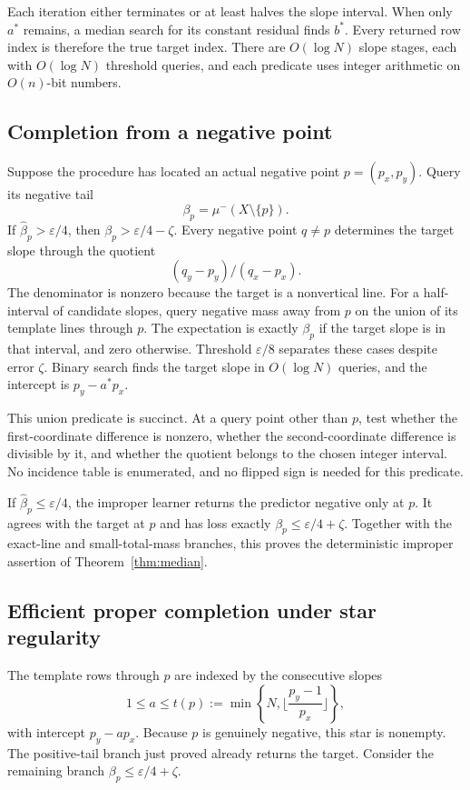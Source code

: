 \documentclass[11pt,letterpaper,pmlr,twoside]{jmlr}
\newcommand{\eps}{\varepsilon}
\newcommand{\floor}[1]{\lfloor #1\rfloor}
\begin{document}
Each iteration either terminates or at least halves the slope interval. When only $a^*$ remains, a median search for its constant residual finds $b^*$. Every returned row index is therefore the true target index. There are $O(\log N)$ slope stages, each with $O(\log N)$ threshold queries, and each predicate uses integer arithmetic on $O(n)$-bit numbers.



\subsection{Completion from a negative point}
Suppose the procedure has located an actual negative point $p=(p_x,p_y)$. Query its negative tail
\[
 \beta_p=\mu^-(X\setminus\{p\}).
\]
If $\hat\beta_p>\eps/4$, then $\beta_p>\eps/4-\zeta$. Every negative point $q\ne p$ determines the target slope through the quotient
\[
 (q_y-p_y)/(q_x-p_x).
\]
The denominator is nonzero because the target is a nonvertical line. For a half-interval of candidate slopes, query negative mass away from $p$ on the union of its template lines through $p$. The expectation is exactly $\beta_p$ if the target slope is in that interval, and zero otherwise. Threshold $\eps/8$ separates these cases despite error $\zeta$. Binary search finds the target slope in $O(\log N)$ queries, and the intercept is $p_y-a^*p_x$.

This union predicate is succinct. At a query point other than $p$, test whether the first-coordinate difference is nonzero, whether the second-coordinate difference is divisible by it, and whether the quotient belongs to the chosen integer interval. No incidence table is enumerated, and no flipped sign is needed for this predicate.

If $\hat\beta_p\le\eps/4$, the improper learner returns the predictor negative only at $p$. It agrees with the target at $p$ and has loss exactly $\beta_p\le\eps/4+\zeta$. Together with the exact-line and small-total-mass branches, this proves the deterministic improper assertion of Theorem~\ref{thm:median}.

\subsection{Efficient proper completion under star regularity}
The template rows through $p$ are indexed by the consecutive slopes
\[
 1\le a\le t(p):=\min\left\{N,\floor{\frac{p_y-1}{p_x}}\right\},
\]
with intercept $p_y-ap_x$. Because $p$ is genuinely negative, this star is nonempty. The positive-tail branch just proved already returns the target. Consider the remaining branch $\beta_p\le\eps/4+\zeta$.
\end{document}
